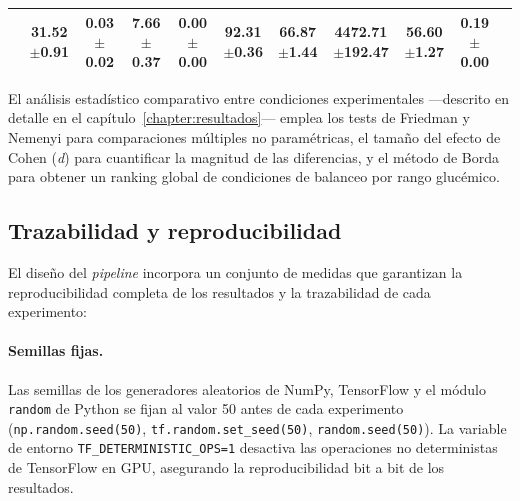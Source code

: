 \begin{table}[htbp]
\begin{tabular}{lcccccccccc}
  & \shortstack{31.52\\\scriptsize$\pm$0.91}
  & \shortstack{0.03\\\scriptsize$\pm$0.02}
  & \shortstack{7.66\\\scriptsize$\pm$0.37}
  & \shortstack{0.00\\\scriptsize$\pm$0.00}
  & \shortstack{92.31\\\scriptsize$\pm$0.36}
  & \shortstack{66.87\\\scriptsize$\pm$1.44}
  & \shortstack{4472.71\\\scriptsize$\pm$192.47}
  & \shortstack{56.60\\\scriptsize$\pm$1.27}
  & \shortstack{0.19\\\scriptsize$\pm$0.00} \\
\bottomrule
\end{tabular}
\end{table}

El análisis estadístico comparativo entre condiciones experimentales ---descrito en detalle en el capítulo~\ref{chapter:resultados}--- emplea los tests de Friedman y Nemenyi para comparaciones múltiples no paramétricas, el tamaño del efecto de Cohen (\textit{d}) para cuantificar la magnitud de las diferencias, y el método de Borda para obtener un ranking global de condiciones de balanceo por rango glucémico.
\subsection{Trazabilidad y reproducibilidad}
\label{subsec:trazabilidad}

El diseño del \textit{pipeline} incorpora un conjunto de medidas que garantizan la reproducibilidad completa de los resultados y la trazabilidad de cada experimento:

\paragraph{Semillas fijas.} Las semillas de los generadores aleatorios de NumPy, TensorFlow y el módulo \texttt{random} de Python se fijan al valor 50 antes de cada experimento (\texttt{np.random.seed(50)}, \texttt{tf.random.set\_seed(50)}, \texttt{random.seed(50)}). La variable de entorno \texttt{TF\_DETERMINISTIC\_OPS=1} desactiva las operaciones no deterministas de TensorFlow en GPU, asegurando la reproducibilidad bit a bit de los resultados.

